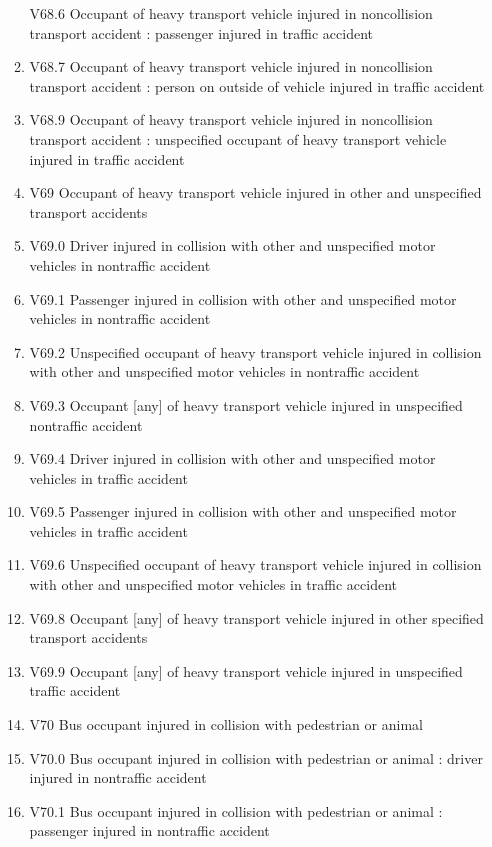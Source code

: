 \documentclass[
]{scrartcl}
\begin{document}
\begin{itemize}
\begin{enumerate}
    V68.6 Occupant of heavy transport vehicle injured in noncollision
    transport accident : passenger injured in traffic accident
  \item
    V68.7 Occupant of heavy transport vehicle injured in noncollision
    transport accident : person on outside of vehicle injured in traffic
    accident
  \item
    V68.9 Occupant of heavy transport vehicle injured in noncollision
    transport accident : unspecified occupant of heavy transport vehicle
    injured in traffic accident
  \item
    V69 Occupant of heavy transport vehicle injured in other and
    unspecified transport accidents
  \item
    V69.0 Driver injured in collision with other and unspecified motor
    vehicles in nontraffic accident
  \item
    V69.1 Passenger injured in collision with other and unspecified
    motor vehicles in nontraffic accident
  \item
    V69.2 Unspecified occupant of heavy transport vehicle injured in
    collision with other and unspecified motor vehicles in nontraffic
    accident
  \item
    V69.3 Occupant {[}any{]} of heavy transport vehicle injured in
    unspecified nontraffic accident
  \item
    V69.4 Driver injured in collision with other and unspecified motor
    vehicles in traffic accident
  \item
    V69.5 Passenger injured in collision with other and unspecified
    motor vehicles in traffic accident
  \item
    V69.6 Unspecified occupant of heavy transport vehicle injured in
    collision with other and unspecified motor vehicles in traffic
    accident
  \item
    V69.8 Occupant {[}any{]} of heavy transport vehicle injured in other
    specified transport accidents
  \item
    V69.9 Occupant {[}any{]} of heavy transport vehicle injured in
    unspecified traffic accident
  \item
    V70 Bus occupant injured in collision with pedestrian or animal
  \item
    V70.0 Bus occupant injured in collision with pedestrian or animal :
    driver injured in nontraffic accident
  \item
    V70.1 Bus occupant injured in collision with pedestrian or animal :
    passenger injured in nontraffic accident

\end{enumerate}
\end{itemize}
\end{document}
